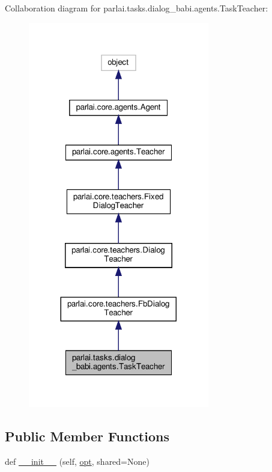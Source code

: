 Collaboration diagram for parlai.\+tasks.\+dialog\+\_\+babi.\+agents.\+Task\+Teacher\+:
\nopagebreak
\begin{figure}[H]
\begin{center}
\leavevmode
\includegraphics[width=224pt]{d7/d2f/classparlai_1_1tasks_1_1dialog__babi_1_1agents_1_1TaskTeacher__coll__graph}
\end{center}
\end{figure}
\subsection*{Public Member Functions}
\begin{DoxyCompactItemize}
\item 
def \hyperlink{classparlai_1_1tasks_1_1dialog__babi_1_1agents_1_1TaskTeacher_a04ad8a9d7b96a3115bc3661bb875eeef}{\+\_\+\+\_\+init\+\_\+\+\_\+} (self, \hyperlink{classparlai_1_1core_1_1teachers_1_1FbDialogTeacher_af7a9ec497b9cd0292d7b8fa220da7c28}{opt}, shared=None)
\end{DoxyCompactItemize}
